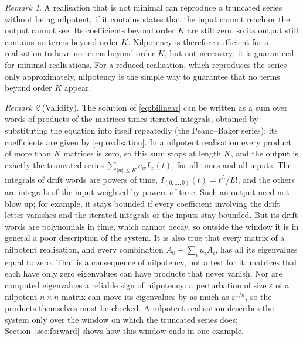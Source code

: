 \documentclass[11pt,a4paper]{article}
\theoremstyle{remark}
\newtheorem{remark}{Remark}
\begin{document}
\begin{remark}
A realisation that is not minimal can reproduce a truncated series without being nilpotent, if it contains states that the input cannot reach or the output cannot see.
Its coefficients beyond order $K$ are still zero, so its output still contains no terms beyond order $K$.
Nilpotency is therefore sufficient for a realisation to have no terms beyond order $K$, but not necessary; it is guaranteed for minimal realisations.
For a reduced realisation, which reproduces the series only approximately, nilpotency is the simple way to guarantee that no terms beyond order $K$ appear.
\end{remark}

\begin{remark}[Validity]
The solution of \eqref{eq:bilinear} can be written as a sum over words of products of the matrices times iterated integrals, obtained by substituting the equation into itself repeatedly (the Peano--Baker series); its coefficients are given by \eqref{eq:realisation}.
In a nilpotent realisation every product of more than $K$ matrices is zero, so this sum stops at length $K$, and the output is exactly the truncated series $\sum_{|w|\le K}c_wI_w(t)$, for all times and all inputs.
The integrals of drift words are powers of time, $I_{(0,\dots,0)}(t)=t^L/L!$, and the others are integrals of the input weighted by powers of time.
Such an output need not blow up; for example, it stays bounded if every coefficient involving the drift letter vanishes and the iterated integrals of the inputs stay bounded.
But its drift words are polynomials in time, which cannot decay, so outside the window it is in general a poor description of the system.
It is also true that every matrix of a nilpotent realisation, and every combination $A_0+\sum_iu_iA_i$, has all its eigenvalues equal to zero.
That is a consequence of nilpotency, not a test for it: matrices that each have only zero eigenvalues can have products that never vanish.
Nor are computed eigenvalues a reliable sign of nilpotency: a perturbation of size $\varepsilon$ of a nilpotent $n\times n$ matrix can move its eigenvalues by as much as $\varepsilon^{1/n}$, so the products themselves must be checked.
A nilpotent realisation describes the system only over the window on which the truncated series does; Section~\ref{sec:forward} shows how this window ends in one example.
\end{remark}
\end{document}
